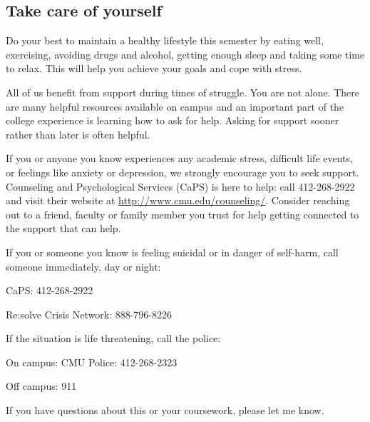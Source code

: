 \documentclass[11pt]{article}
\begin{document}
\subsection{Take care of yourself}
\label{sec:orgheadline13}
Do your best to maintain a healthy lifestyle this semester by eating well, exercising, avoiding drugs and alcohol, getting enough sleep and taking some time to relax. This will help you achieve your goals and cope with stress.

All of us benefit from support during times of struggle. You are not alone. There are many helpful resources available on campus and an important part of the college experience is learning how to ask for help. Asking for support sooner rather than later is often helpful.

If you or anyone you know experiences any academic stress, difficult life events, or feelings like anxiety or depression, we strongly encourage you to seek support. Counseling and Psychological Services (CaPS) is here to help: call 412-268-2922 and visit their website at \url{http://www.cmu.edu/counseling/}. Consider reaching out to a friend, faculty or family member you trust for help getting connected to the support that can help.

If you or someone you know is feeling suicidal or in danger of self-harm, call someone immediately, day or night:

CaPS: 412-268-2922

Re:solve Crisis Network: 888-796-8226

If the situation is life threatening, call the police:

On campus: CMU Police: 412-268-2323

Off campus: 911

If you have questions about this or your coursework, please let me know.
\end{document}
